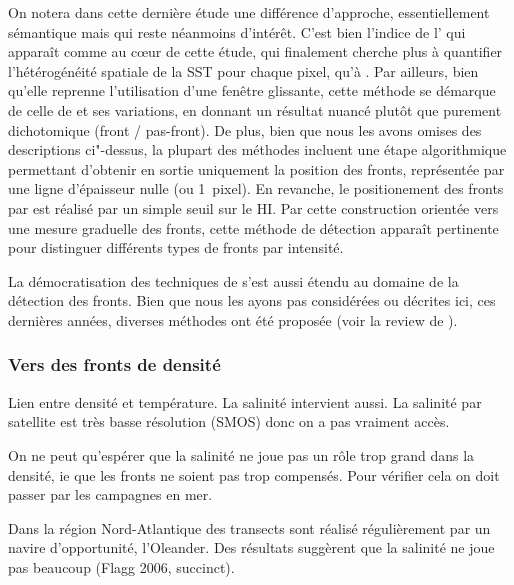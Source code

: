 On notera dans cette dernière étude une différence d'approche, essentiellement sémantique mais qui reste néanmoins d'intérêt.
C'est bien l'indice de l' qui apparaît comme au cœur de cette étude, qui finalement cherche plus à quantifier l'hétérogénéité spatiale de la SST pour chaque pixel, qu'à .
Par ailleurs, bien qu'elle reprenne l'utilisation d'une fenêtre glissante, cette méthode se démarque de celle de  et ses variations, en donnant un résultat nuancé plutôt que purement dichotomique (front / pas-front).
De plus, bien que nous les avons omises des descriptions ci"-dessus, la plupart des méthodes incluent une étape algorithmique permettant d'obtenir en sortie uniquement la position des fronts, représentée par une ligne d'épaisseur nulle (ou 1~pixel).
En revanche, le positionement des fronts par \citeauthor{liu_2016} est réalisé par un simple\footnotemark{} seuil sur le HI.
Par cette construction orientée vers une mesure graduelle des fronts, cette méthode de détection apparaît pertinente pour distinguer différents types de fronts par intensité.

\begin{note}
  La démocratisation des techniques de  s'est aussi étendu au domaine de la détection des fronts.
  Bien que nous les ayons pas considérées ou décrites ici, ces dernières années, diverses méthodes ont été proposée (voir la review de \cite{liu_2022}).
\end{note}

\subsubsection{Vers des fronts de densité}

Lien entre densité et température.
La salinité intervient aussi. La salinité par satellite est très basse résolution (SMOS) donc on a pas vraiment accès.

On ne peut qu'espérer que la salinité ne joue pas un rôle trop grand dans la densité, ie que les fronts ne soient pas trop compensés.
Pour vérifier cela on doit passer par les campagnes en mer.

Dans la région Nord-Atlantique des transects sont réalisé régulièrement par un navire d'opportunité, l'Oleander.
Des résultats suggèrent que la salinité ne joue pas beaucoup (Flagg 2006, succinct).

